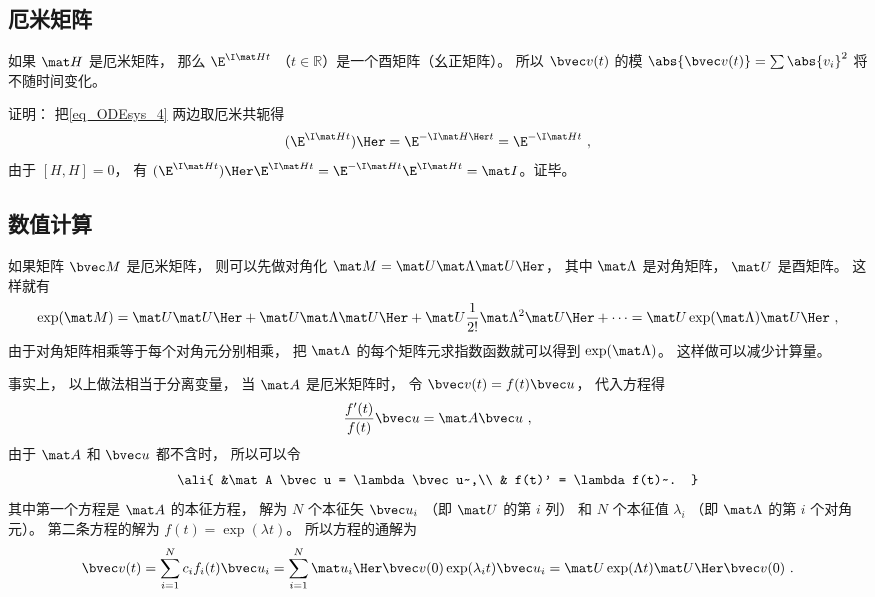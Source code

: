 \subsection{厄米矩阵}
如果 $\mat H$ 是厄米矩阵， 那么 $\E^{\I \mat H t}$ （$t\in \mathbb R$）是一个酉矩阵（幺正矩阵）。 所以 $\bvec v(t)$ 的模 $\abs{\bvec v(t)} = \sum \abs{v_i}^2$ 将不随时间变化。

证明： 把\autoref{eq_ODEsys_4} 两边取厄米共轭得
\begin{equation}
(\E^{\I \mat H t})\Her = \E^{-\I \mat H\Her t} = \E^{-\I \mat H t}~,
\end{equation}
由于 $[H,H] = 0$， 有 $(\E^{\I \mat H t})\Her \E^{\I \mat H t} = \E^{-\I \mat H t}\E^{\I \mat H t} = \mat I$。证毕。

\subsection{数值计算}
如果矩阵 $\bvec M$ 是厄米矩阵， 则可以先做对角化 $\mat M = \mat U \mat \Lambda \mat U\Her$， 其中 $\mat \Lambda$ 是对角矩阵， $\mat U$ 是酉矩阵。 这样就有
\begin{equation}
\exp(\mat M) = \mat U \mat U\Her + \mat U\mat \Lambda\mat U\Her + \mat U\frac1{2!} \mat \Lambda^2 \mat U\Her + \dots = \mat U \exp(\mat \Lambda) \mat U\Her~,
\end{equation}
由于对角矩阵相乘等于每个对角元分别相乘， 把 $\mat\Lambda$ 的每个矩阵元求指数函数就可以得到 $\exp(\mat \Lambda)$。 这样做可以减少计算量。

事实上， 以上做法相当于分离变量， 当 $\mat A$ 是厄米矩阵时， 令 $\bvec v(t) = f(t)\bvec u$， 代入方程得 
\begin{equation}
\frac{f'(t)}{f(t)} \bvec u = \mat A \bvec u~,
\end{equation}
由于 $\mat A$ 和 $\bvec u$ 都不含时， 所以可以令
\begin{equation}\ali{
&\mat A \bvec u = \lambda \bvec u~,\\
& f(t)' = \lambda f(t)~.
}\end{equation}
其中第一个方程是 $\mat A$ 的本征方程， 解为 $N$ 个本征矢 $\bvec u_i$ （即 $\mat U$ 的第 $i$ 列） 和 $N$ 个本征值 $\lambda_i$ （即 $\mat \Lambda$ 的第 $i$ 个对角元）。 第二条方程的解为 $f(t) = \exp(\lambda t)$。 所以方程的通解为
\begin{equation}
\bvec v(t) = \sum_{i = 1}^N c_i f_i(t) \bvec u_i = \sum_{i = 1}^N \mat u_i\Her  \bvec v(0) \exp(\lambda_i t) \bvec u_i = \mat U \exp(\Lambda t) \mat U\Her \bvec v(0)~.
\end{equation}

